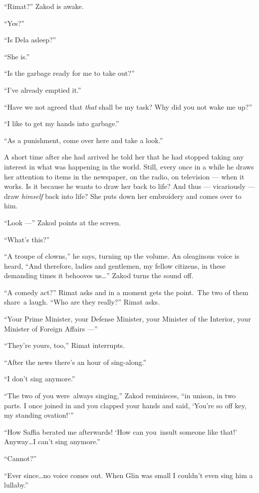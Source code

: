 \documentclass[twoside,11pt,openany]{book}
\begin{document}
``Rimat?'' Zakod is awake.

``Yes?''

``Is Dela asleep?''

``She is.''

``Is the garbage ready for me to take out?''

``I've already emptied it.''

``Have we not agreed that \textit{that} shall be my task? Why did you not wake me up?''

``I like to get my hands into garbage.''

``As a punishment, come over here and take a look.''

A short time after she had arrived he told her that he had stopped taking any interest in what was happening in the
world. Still, every once in a while he draws her attention to items in the newspaper, on the radio, on television ---
when it works. Is it because he wants to draw her back to life? And thus --- vicariously --- draw \textit{himself} back
into life? She puts down her embroidery and comes over to him.

``Look ---'' Zakod points at the screen.

``What's this?''

``A troupe of clowns,'' he says, turning up the volume. An oleaginous voice is heard,
``And therefore, ladies and gentlemen, my fellow citizens, in these demanding times it behooves
us{\ldots}'' Zakod turns the sound off.

``A comedy act?'' Rimat asks and in a moment gets the point.~The two of them share~a laugh.
``Who are they really?'' Rimat asks.

``Your Prime Minister, your Defense Minister, your Minister of the Interior, your Minister of Foreign
Affairs ---''

``They're yours, too,'' Rimat interrupts.

``After the news there's an hour of sing-along.''

``I don't sing anymore.''

``The two of you were~always singing,'' Zakod reminisces, ``in unison, in two
parts. I once joined in and you clapped your hands and said, `You're so off key, my standing ovation!'\thinspace''

``How Saffia berated me afterwards!  `How can you~insult someone like that!' Anyway{\ldots}I can't sing
anymore.''

``Cannot?''

``Ever since{\ldots}no voice comes out. When Glin was small I couldn't even sing him a
lullaby.''
\end{document}

